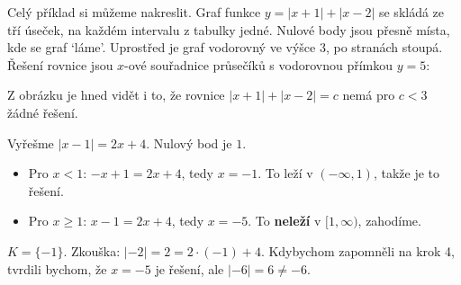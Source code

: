 Celý příklad si můžeme nakreslit. Graf funkce $y = |x + 1| + |x - 2|$ se skládá ze tří úseček, na každém intervalu z tabulky jedné. Nulové body jsou přesně místa, kde se graf `láme'. Uprostřed je graf vodorovný ve výšce $3$, po stranách stoupá. Řešení rovnice jsou $x$-ové souřadnice průsečíků s vodorovnou přímkou $y = 5$:
\begin{center}
\end{center}
Z obrázku je hned vidět i to, že rovnice $|x + 1| + |x - 2| = c$ nemá pro $c < 3$ žádné řešení.

\begin{example}
  Vyřešme $|x - 1| = 2x + 4$. Nulový bod je $1$.
  \begin{itemize}
    \item Pro $x < 1$: $-x + 1 = 2x + 4$, tedy $x = -1$. To leží v $(-\infty, 1)$, takže je to řešení.
    \item Pro $x\geq 1$: $x - 1 = 2x + 4$, tedy $x = -5$. To \textbf{neleží} v $[1, \infty)$, zahodíme.
  \end{itemize}
  $K = \{-1\}$. Zkouška: $|-2| = 2 = 2\cdot(-1) + 4$. Kdybychom zapomněli na krok 4, tvrdili bychom, že $x = -5$ je řešení, ale $|-6| = 6\neq -6$.
\end{example}

